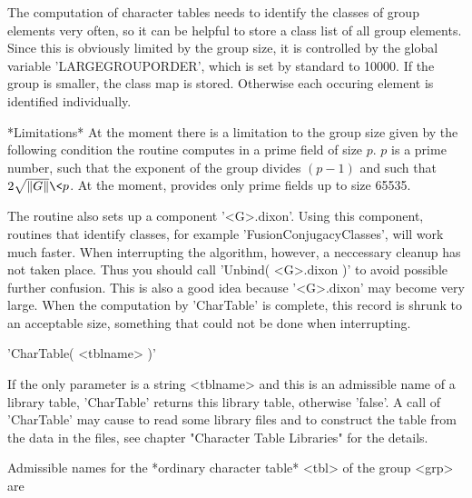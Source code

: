The  computation of  character tables  needs  to  identify the classes of
group elements very  often, so it can be helpful to store a class list of
all group elements. Since this is obviously limited by the group size, it
is controlled by the global variable 'LARGEGROUPORDER', which  is set  by
standard to 10000. If the group is smaller,  the  class  map  is  stored.
Otherwise each occuring element is identified individually.

*Limitations{\:}* At the moment  there  is a limitation to the group size
given by the  following condition{\:}  the routine  computes  in  a prime
field of size $p$.  $p$ is a prime number, such that the exponent  of the
group divides  $(p-1)$  and  such  that $2  \sqrt{\|G\|}  \< p$.   At the
moment, {\GAP} provides only prime fields up to size 65535.

The routine also sets up a component  '<G>.dixon'. Using this  component,
routines  that  identify  classes, for  example 'FusionConjugacyClasses',
will  work  much  faster.  When  interrupting  the algorithm, however,  a
neccessary cleanup has  not  taken place.  Thus you should  call 'Unbind(
<G>.dixon  )' to  avoid possible further confusion.  This is also  a good
idea  because '<G>.dixon' may become very large. When the  computation by
'CharTable'  is  complete, this record is  shrunk  to an acceptable size,
something that could not be done when interrupting.

\vspace{5mm}

'CharTable( <tblname> )'

If the only parameter is a string <tblname>  and  this is  an  admissible
name  of  a  library  table,  'CharTable'  returns  this  library  table,
otherwise 'false'.   A call of 'CharTable' may cause to read some library
files and  to construct the table from the data in the files, see chapter
"Character Table Libraries" for the details.

Admissible names  for  the *ordinary character table* <tbl> of the  group
<grp> are

